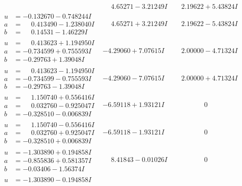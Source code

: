 \documentclass[1p]{elsarticle_modified}
\theoremstyle{definition}
\begin{document}
$$\begin{array}{c|c|c}
 & \phantom{-}4.65271 - 3.21249 I & \phantom{-}2.19622 + 5.43824 I \\ \hline\begin{aligned}
u &= -0.132670 - 0.748244 I \\
a &= \phantom{-}0.413490 - 1.238040 I \\
b &= \phantom{-}0.14531 - 1.46229 I\end{aligned}
 & \phantom{-}4.65271 + 3.21249 I & \phantom{-}2.19622 - 5.43824 I \\ \hline\begin{aligned}
u &= \phantom{-}0.413623 + 1.194950 I \\
a &= -0.734599 + 0.755593 I \\
b &= -0.29763 + 1.39048 I\end{aligned}
 & -4.29060 + 7.07615 I & \phantom{-}2.00000 - 4.71324 I \\ \hline\begin{aligned}
u &= \phantom{-}0.413623 - 1.194950 I \\
a &= -0.734599 - 0.755593 I \\
b &= -0.29763 - 1.39048 I\end{aligned}
 & -4.29060 - 7.07615 I & \phantom{-}2.00000 + 4.71324 I \\ \hline\begin{aligned}
u &= \phantom{-}1.150740 + 0.556416 I \\
a &= \phantom{-}0.032760 - 0.925047 I \\
b &= -0.328510 - 0.006839 I\end{aligned}
 & -6.59118 + 1.93121 I & \phantom{-0.000000 } 0 \\ \hline\begin{aligned}
u &= \phantom{-}1.150740 - 0.556416 I \\
a &= \phantom{-}0.032760 + 0.925047 I \\
b &= -0.328510 + 0.006839 I\end{aligned}
 & -6.59118 - 1.93121 I & \phantom{-0.000000 } 0 \\ \hline\begin{aligned}
u &= -1.303890 + 0.194858 I \\
a &= -0.855836 + 0.581357 I \\
b &= -0.03406 - 1.56374 I\end{aligned}
 & \phantom{-}8.41843 - 0.01026 I & \phantom{-0.000000 } 0 \\ \hline\begin{aligned}
u &= -1.303890 - 0.194858 I \\

\end{aligned}
\end{array}$$
\end{document}
